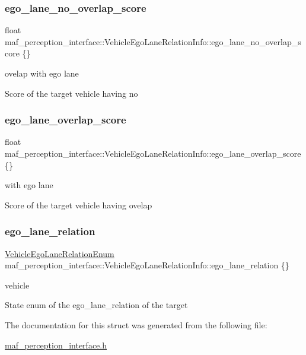 \subsubsection{\texorpdfstring{ego\+\_\+lane\+\_\+no\+\_\+overlap\+\_\+score}{ego\_lane\_no\_overlap\_score}}
{\footnotesize\ttfamily float maf\+\_\+perception\+\_\+interface\+::\+Vehicle\+Ego\+Lane\+Relation\+Info\+::ego\+\_\+lane\+\_\+no\+\_\+overlap\+\_\+score \{\}}



ovelap with ego lane 

Score of the target vehicle having no \mbox{\label{structmaf__perception__interface_1_1VehicleEgoLaneRelationInfo_a5a1eee01b1222329244eb036ee0308d6}} 
\subsubsection{\texorpdfstring{ego\+\_\+lane\+\_\+overlap\+\_\+score}{ego\_lane\_overlap\_score}}
{\footnotesize\ttfamily float maf\+\_\+perception\+\_\+interface\+::\+Vehicle\+Ego\+Lane\+Relation\+Info\+::ego\+\_\+lane\+\_\+overlap\+\_\+score \{\}}



with ego lane 

Score of the target vehicle having ovelap \mbox{\label{structmaf__perception__interface_1_1VehicleEgoLaneRelationInfo_a01c6ed4e8ba5862836eecd4686a1dd1d}} 
\subsubsection{\texorpdfstring{ego\+\_\+lane\+\_\+relation}{ego\_lane\_relation}}
{\footnotesize\ttfamily \hyperlink{structmaf__perception__interface_1_1VehicleEgoLaneRelationEnum}{Vehicle\+Ego\+Lane\+Relation\+Enum} maf\+\_\+perception\+\_\+interface\+::\+Vehicle\+Ego\+Lane\+Relation\+Info\+::ego\+\_\+lane\+\_\+relation \{\}}



vehicle 

State enum of the ego\+\_\+lane\+\_\+relation of the target 

The documentation for this struct was generated from the following file\+:\begin{DoxyCompactItemize}
\item 
\hyperlink{maf__perception__interface_8h}{maf\+\_\+perception\+\_\+interface.\+h}\end{DoxyCompactItemize}
